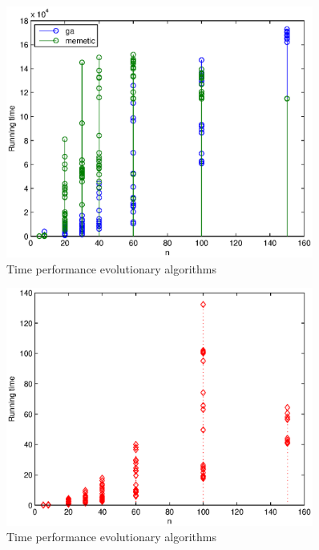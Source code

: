 \begin{figure}[!htbp]
  \begin{center}
   \includegraphics[width=0.9\textwidth]{Images/Chapter5/compare_times_evol.eps}
  \end{center}
    \caption{Time performance evolutionary algorithms}\label{fig:compare_times_evol}
\end{figure}

\begin{figure}[!htbp]
  \begin{center}
   \includegraphics[width=0.9\textwidth]{Images/Chapter5/compare_times_ra.eps}
  \end{center}
    \caption{Time performance evolutionary algorithms}\label{fig:compare_times_ra}
\end{figure}
